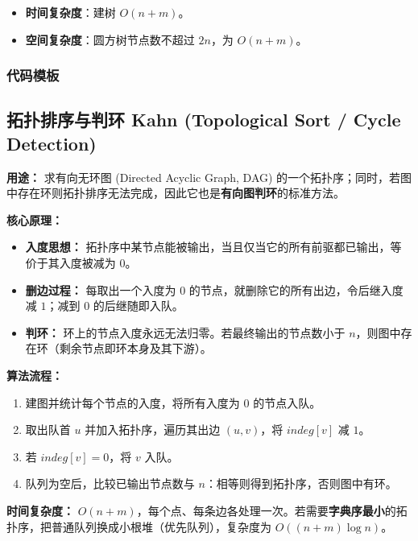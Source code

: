 \begin{itemize}
  \item \textbf{时间复杂度}：建树 $O(n + m)$。
  \item \textbf{空间复杂度}：圆方树节点数不超过 $2n$，为 $O(n + m)$。
\end{itemize}

\subsubsection{代码模板}



\subsection{拓扑排序与判环 Kahn (Topological Sort / Cycle Detection)}

\textbf{用途：} 求有向无环图 (Directed Acyclic Graph, DAG) 的一个拓扑序；同时，若图中存在环则拓扑排序无法完成，因此它也是\textbf{有向图判环}的标准方法。

\textbf{核心原理：}

\begin{itemize}
  \item \textbf{入度思想：} 拓扑序中某节点能被输出，当且仅当它的所有前驱都已输出，等价于其入度被减为 $0$。
  \item \textbf{删边过程：} 每取出一个入度为 $0$ 的节点，就删除它的所有出边，令后继入度减 $1$；减到 $0$ 的后继随即入队。
  \item \textbf{判环：} 环上的节点入度永远无法归零。若最终输出的节点数小于 $n$，则图中存在环（剩余节点即环本身及其下游）。
\end{itemize}

\textbf{算法流程：}

\begin{enumerate}
  \item 建图并统计每个节点的入度，将所有入度为 $0$ 的节点入队。
  \item 取出队首 $u$ 并加入拓扑序，遍历其出边 $(u, v)$，将 $\mathit{indeg}[v]$ 减 $1$。
  \item 若 $\mathit{indeg}[v] = 0$，将 $v$ 入队。
  \item 队列为空后，比较已输出节点数与 $n$：相等则得到拓扑序，否则图中有环。
\end{enumerate}

\textbf{时间复杂度：} $O(n + m)$，每个点、每条边各处理一次。若需要\textbf{字典序最小}的拓扑序，把普通队列换成小根堆（优先队列），复杂度为 $O((n + m) \log n)$。

